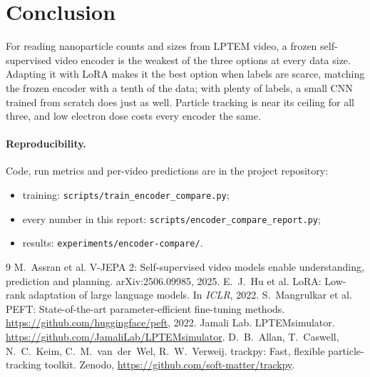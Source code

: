 \documentclass[11pt,a4paper]{article}
\begin{document}
\section{Conclusion}

For reading nanoparticle counts and sizes from LPTEM video, a frozen self-supervised
video encoder is the weakest of the three options at every data size. Adapting it with
LoRA makes it the best option when labels are scarce, matching the frozen encoder with a
tenth of the data; with plenty of labels, a small CNN trained from scratch does just as
well. Particle tracking is near its ceiling for all three, and low electron dose costs
every encoder the same.

\paragraph{Reproducibility.} Code, run metrics and per-video predictions are in the
project repository:
\begin{itemize}
  \item training: \texttt{scripts/train\_encoder\_compare.py};
  \item every number in this report: \texttt{scripts/encoder\_compare\_report.py};
  \item results: \texttt{experiments/encoder-compare/}.
\end{itemize}

\begin{thebibliography}{9}
 M.~Assran et al.
  \newblock V-JEPA 2: Self-supervised video models enable understanding, prediction and
  planning. \newblock arXiv:2506.09985, 2025.
 E.~J.~Hu et al.
  \newblock LoRA: Low-rank adaptation of large language models.
  \newblock In \emph{ICLR}, 2022.
 S.~Mangrulkar et al.
  \newblock PEFT: State-of-the-art parameter-efficient fine-tuning methods.
  \newblock \url{https://github.com/huggingface/peft}, 2022.
 Jamali Lab.
  \newblock LPTEMsimulator. \newblock \url{https://github.com/JamaliLab/LPTEMsimulator}.
 D.~B.~Allan, T.~Caswell, N.~C.~Keim, C.~M.~van~der~Wel, R.~W.~Verweij.
  \newblock trackpy: Fast, flexible particle-tracking toolkit.
  \newblock Zenodo, \url{https://github.com/soft-matter/trackpy}.
\end{thebibliography}
\end{document}
